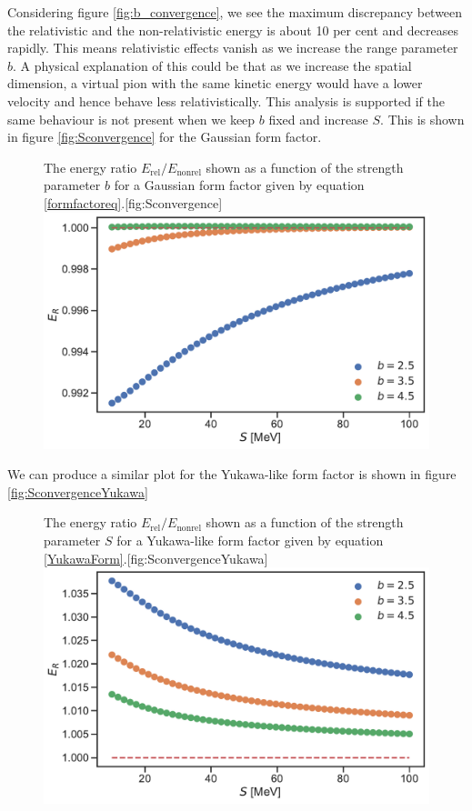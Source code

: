 Considering figure \ref{fig:b_convergence}, we see the maximum discrepancy between the relativistic and the non-relativistic energy is about 10 per cent and decreases rapidly. This means relativistic effects vanish as we increase the range parameter $b$. A physical explanation of this could be that as we increase the spatial dimension, a virtual pion with the same kinetic energy would have a lower velocity and hence behave less relativistically. This analysis is supported if the same behaviour is not present when we keep $b$ fixed and increase $S$. This is shown in figure \ref{fig:Sconvergence} for the Gaussian form factor.
\begin{figure}[H]
	\begin{sidecaption}{The energy ratio $E_\text{rel}/E_\text{nonrel}$ shown as a function of the strength parameter $b$ for a Gaussian form factor given by equation \eqref{formfactoreq}.}[fig:Sconvergence]
		\includegraphics[width=\linewidth]{Figures/Sconvergence.pdf}
	\end{sidecaption}
\end{figure}
We can produce a similar plot for the Yukawa-like form factor is shown in figure \ref{fig:SconvergenceYukawa}
\begin{figure}[H]
	\begin{sidecaption}{The energy ratio $E_\text{rel}/E_\text{nonrel}$ shown as a function of the strength parameter $S$ for a Yukawa-like form factor given by equation \eqref{YukawaForm}.}[fig:SconvergenceYukawa]
		\includegraphics[width=\linewidth]{Figures/SconvergenceYukawa.pdf}
	\end{sidecaption}
\end{figure}
